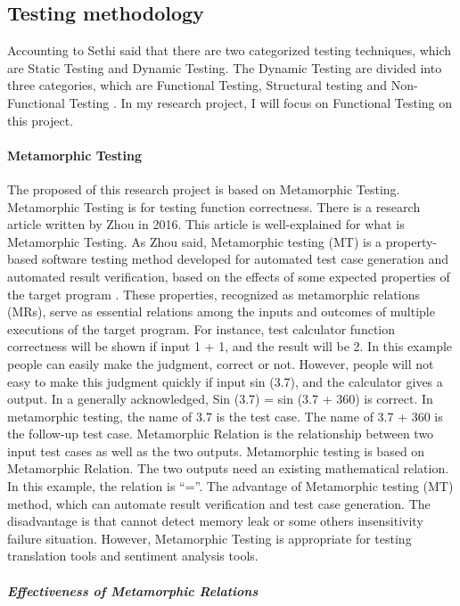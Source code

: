 \documentclass[conference]{IEEEtran}
\begin{document}
\subsection{Testing methodology}
Accounting to Sethi said that there are two categorized testing
techniques, which are Static Testing and Dynamic Testing. The Dynamic Testing
are divided into three categories, which are Functional Testing, Structural
testing and Non-Functional Testing \cite{testingMethodReview}.
In my research project, I will focus on Functional Testing on this project.

\paragraph{Metamorphic Testing}
The proposed of this research project is based on Metamorphic Testing.
Metamorphic Testing is for testing function correctness.
There is a research article written by Zhou in 2016. This article is
well-explained for what is Metamorphic Testing.
As Zhou said, Metamorphic testing (MT) is a property-based software testing
method developed for automated test case generation and automated result
verification, based on the effects of some expected properties of the target
program \cite{zhou2016metamorphic}.
These properties, recognized as metamorphic relations (MRs), serve as essential
relations among the inputs and outcomes of multiple executions of the target
program.
For instance, test calculator function correctness will be shown if input 1 + 1,
and the result will be 2. In this example people can easily make the judgment,
correct or not.
However, people will not easy to make this judgment quickly if input sin (3.7),
and the calculator gives a output.
In a generally acknowledged, Sin (3.7) = sin (3.7 + 360) is correct.
In metamorphic testing, the name of 3.7 is the test case. The name of 3.7 + 360
is the follow-up test case.
Metamorphic Relation is the relationship between two input test cases as well as
the two outputs.
Metamorphic testing is based on Metamorphic Relation.
The two outputs need an existing mathematical relation.
In this example, the relation is “=”. The advantage of Metamorphic testing (MT)
method, which can automate result verification and test case generation.
The disadvantage is that cannot detect memory leak or some others insensitivity
failure situation.
However, Metamorphic Testing is appropriate for testing translation tools and
sentiment analysis tools.
\subparagraph{Effectiveness of Metamorphic Relations}
\end{document}
